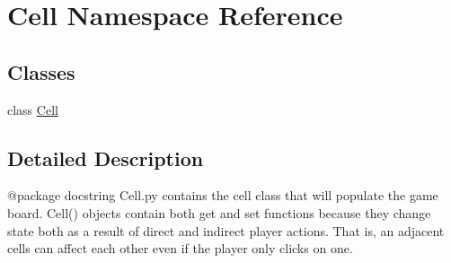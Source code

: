 \hypertarget{namespace_cell}{}\section{Cell Namespace Reference}
\label{namespace_cell}
\subsection*{Classes}
\begin{DoxyCompactItemize}
\item 
class \mbox{\hyperlink{class_cell_1_1_cell}{Cell}}
\end{DoxyCompactItemize}


\subsection{Detailed Description}
\begin{DoxyVerb}@package docstring
   Cell.py contains the cell class that will populate the game board. Cell()
   objects contain both get and set functions because they change state both
   as a result of direct and indirect player actions. That is, an adjacent cells
   can affect each other even if the player only clicks on one.
\end{DoxyVerb}
 